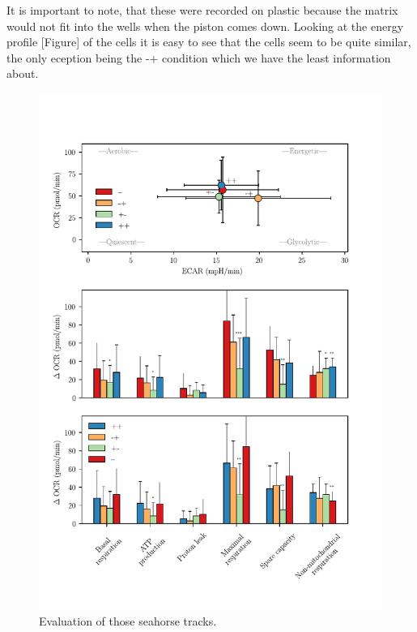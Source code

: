     It is important to note, that these were recorded on plastic because the matrix would not fit into the wells when the piston comes down. Looking at the energy profile [Figure] of the cells it is easy to see that the cells seem to be quite similar, the only eception being the -+ condition which we have the least information about.

    \begin{figure}[h]
    \capstart
        \centering
    	\includegraphics{Abbildung/seaborn_energy_profiles.pdf}

    	\begin{minipage}{\captionwidth}
    		\caption[energy_profile]{ \newline Evaluation of those seahorse tracks.}
    		\label{fig:energy_profile}
    	\end{minipage}
    \end{figure}

